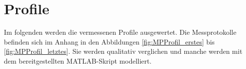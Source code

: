 
\section{Profile}
\label{sec:profile}

Im folgenden werden die vermessenen Profile ausgewertet. Die Messprotokolle befinden sich im Anhang in den Abbildungen \ref{fig:MPProfil_erstes} bis \ref{fig:MPProfil_letztes}. Sie werden qualitativ verglichen und manche werden mit dem bereitgestellten MATLAB-Skript modelliert.

